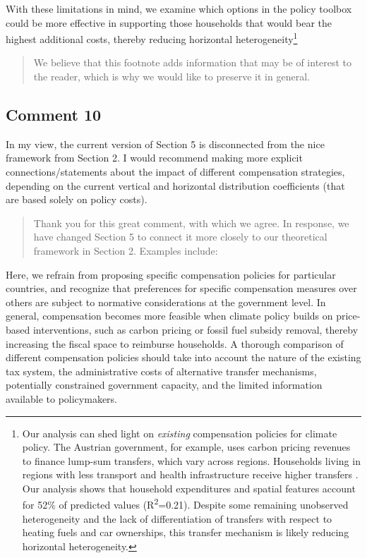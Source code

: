 \documentclass[11pt]{article}
\newenvironment{response}
{\begin{quote}\color{black}}
{\end{quote}}
\begin{document}
\begin{revisionbox}
    With these limitations in mind, we examine which options in the policy toolbox could be more effective in supporting those households that would bear the highest additional costs, thereby reducing horizontal heterogeneity\footnote{Our analysis can shed light on \textit{existing} compensation policies for climate policy. The Austrian government, for example, uses carbon pricing revenues to finance lump-sum transfers, which vary across regions. Households living in regions with less transport and health infrastructure receive higher transfers \autocite{BMK.2023}. Our analysis shows that household expenditures and spatial features account for 52\% of predicted values (R\textsuperscript{2}=0.21). Despite some remaining unobserved heterogeneity and the lack of differentiation of transfers with respect to heating fuels and car ownerships, this transfer mechanism is likely reducing horizontal heterogeneity.}
\end{revisionbox}

\begin{response}
    We believe that this footnote adds information that may be of interest to the reader, which is why we would like to preserve it in general.
\end{response}
    
\subsection*{Comment 10}\label{comment_R2_10}

\begin{commentbox}
    In my view, the current version of Section 5 is disconnected from the nice framework from Section 2. I would recommend making more explicit connections/statements about the impact of different compensation strategies, depending on the current vertical and horizontal distribution coefficients (that are based solely on policy costs).
\end{commentbox}

\begin{response}
    Thank you for this great comment, with which we agree. In response, we have changed Section 5 to connect it more closely to our theoretical framework in Section 2. Examples include:
\end{response}

\begin{revisionbox}
    Here, we refrain from proposing specific compensation policies for particular countries, and recognize that preferences for specific compensation measures over others are subject to normative considerations at the government level. In general, compensation becomes more feasible when climate policy builds on price-based interventions, such as carbon pricing or fossil fuel subsidy removal, thereby increasing the fiscal space to reimburse households. A thorough comparison of different compensation policies should take into account the nature of the existing tax system, the administrative costs of alternative transfer mechanisms, potentially constrained government capacity, and the limited information available to policymakers.
\end{revisionbox}
\end{document}
